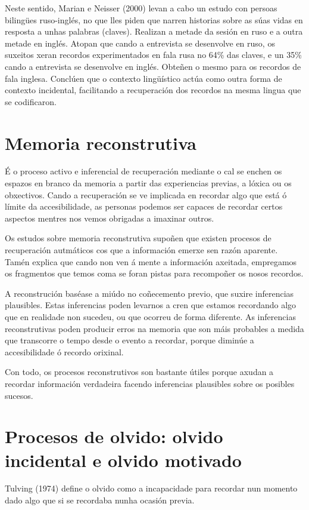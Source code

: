 \documentclass[a4paper,11pt]{article}
\begin{document}
\begin{itemize}
	Neste sentido, Marian e Neisser (2000) levan a cabo un estudo con persoas bilingües ruso-inglés, 
	no que lles piden que narren historias sobre as súas vidas en resposta a unhas palabras 
	(claves). Realizan a metade da sesión en ruso e a outra metade en inglés. Atopan que cando a 
	entrevista se desenvolve en ruso, os suxeitos xeran recordos experimentados en fala rusa no 
	64\% das claves, e un 35\% cando a entrevista se desenvolve en inglés. Obteñen o mesmo para os 
	recordos de fala inglesa. Conclúen que o contexto lingüístico actúa como outra forma de contexto 
	incidental, facilitando a recuperación dos recordos na mesma lingua que se codificaron.
\end{itemize}

\section{Memoria reconstrutiva}
É o proceso activo e inferencial de recuperación mediante o cal se enchen os espazos en branco da memoria a partir das experiencias previas, a lóxica ou os obxectivos. Cando a recuperación se ve implicada en recordar algo que está ó límite da accesibilidade, as personas podemos ser capaces de recordar certos aspectos mentres nos vemos obrigadas a imaxinar outros. 

Os estudos sobre memoria reconstrutiva supoñen que existen procesos de recuperación autmáticos cos que a información emerxe sen razón aparente. Tamén explica que cando non ven á mente a información axeitada, empregamos os fragmentos que temos coma se foran pistas para recompoñer os nosos recordos. 

A reconstrución baséase a miúdo no coñecemento previo, que suxire inferencias plausibles. Estas inferencias poden levarnos a cren que estamos recordando algo que en realidade non sucedeu, ou que ocorreu de forma diferente. As inferencias reconstrutivas poden producir erros na memoria que son máis probables a medida que transcorre o tempo desde o evento a recordar, porque diminúe a accesibilidade ó recordo orixinal. 

Con todo, os procesos reconstrutivos son bastante útiles porque axudan a recordar información verdadeira facendo inferencias plausibles sobre os posibles sucesos.

\section{Procesos de olvido: olvido incidental e olvido motivado}
Tulving (1974) define o olvido como a incapacidade para recordar nun momento dado algo que si se recordaba nunha ocasión previa.
\end{document}
